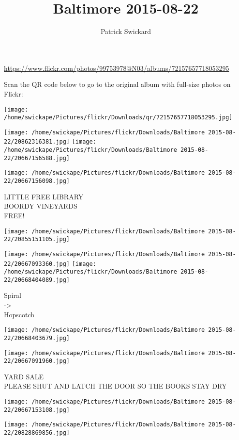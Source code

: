 \documentclass[10pt,letterpaper]{article}
\title{Baltimore 2015-08-22}
\author{Patrick Swickard}
\date{}
\begin{document}
\maketitle

\url{https://www.flickr.com/photos/99753978@N03/albums/72157657718053295}

Scan the QR code below to go to the original album with full-size photos on Flickr:

\texttt{[image: /home/swickape/Pictures/flickr/Downloads/qr/72157657718053295.jpg]}
\pagebreak

\texttt{[image: /home/swickape/Pictures/flickr/Downloads/Baltimore 2015-08-22/20862316381.jpg]}
\texttt{[image: /home/swickape/Pictures/flickr/Downloads/Baltimore 2015-08-22/20667156588.jpg]}

\vspace{0.25in}
\texttt{[image: /home/swickape/Pictures/flickr/Downloads/Baltimore 2015-08-22/20667156098.jpg]}

LITTLE FREE LIBRARY\\
BOORDY VINEYARDS\\
FREE!
\pagebreak

\texttt{[image: /home/swickape/Pictures/flickr/Downloads/Baltimore 2015-08-22/20855151105.jpg]}

\vspace{0.25in}
\texttt{[image: /home/swickape/Pictures/flickr/Downloads/Baltimore 2015-08-22/20667093360.jpg]}
\texttt{[image: /home/swickape/Pictures/flickr/Downloads/Baltimore 2015-08-22/20668404089.jpg]}

Spiral\\
{-}>\\
Hopscotch
\pagebreak

\texttt{[image: /home/swickape/Pictures/flickr/Downloads/Baltimore 2015-08-22/20668403679.jpg]}

\vspace{0.25in}
\texttt{[image: /home/swickape/Pictures/flickr/Downloads/Baltimore 2015-08-22/20667091960.jpg]}

YARD SALE\\
PLEASE SHUT AND LATCH THE DOOR SO THE BOOKS STAY DRY
\pagebreak

\texttt{[image: /home/swickape/Pictures/flickr/Downloads/Baltimore 2015-08-22/20667153108.jpg]}

\vspace{0.25in}
\texttt{[image: /home/swickape/Pictures/flickr/Downloads/Baltimore 2015-08-22/20828869856.jpg]}
\end{document}
